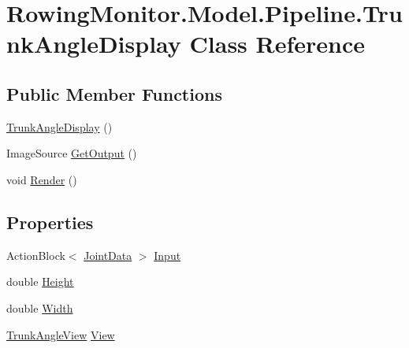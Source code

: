 \hypertarget{class_rowing_monitor_1_1_model_1_1_pipeline_1_1_trunk_angle_display}{}\section{Rowing\+Monitor.\+Model.\+Pipeline.\+Trunk\+Angle\+Display Class Reference}
\label{class_rowing_monitor_1_1_model_1_1_pipeline_1_1_trunk_angle_display}
\subsection*{Public Member Functions}
\begin{DoxyCompactItemize}
\item 
\hyperlink{class_rowing_monitor_1_1_model_1_1_pipeline_1_1_trunk_angle_display_aa821fa5b4473ec7cc3ce2947fb9b4b73}{Trunk\+Angle\+Display} ()
\item 
Image\+Source \hyperlink{class_rowing_monitor_1_1_model_1_1_pipeline_1_1_trunk_angle_display_ac1e4cc748894dc3d2bb8bbd0ec17226e}{Get\+Output} ()
\item 
void \hyperlink{class_rowing_monitor_1_1_model_1_1_pipeline_1_1_trunk_angle_display_a3f82a22f8d195e8285ec1008514b8a3a}{Render} ()
\end{DoxyCompactItemize}
\subsection*{Properties}
\begin{DoxyCompactItemize}
\item 
Action\+Block$<$ \hyperlink{struct_rowing_monitor_1_1_model_1_1_util_1_1_joint_data}{Joint\+Data} $>$ \hyperlink{class_rowing_monitor_1_1_model_1_1_pipeline_1_1_trunk_angle_display_a2bbac9839cfa5977f133be79c3c47754}{Input}
\item 
double \hyperlink{class_rowing_monitor_1_1_model_1_1_pipeline_1_1_trunk_angle_display_ad8ae0fc35ad101ac1c7e5fa75eace01e}{Height}
\item 
double \hyperlink{class_rowing_monitor_1_1_model_1_1_pipeline_1_1_trunk_angle_display_a44e27b142945a82a101bb38cbd5a3c1f}{Width}
\item 
\hyperlink{class_rowing_monitor_1_1_view_1_1_trunk_angle_view}{Trunk\+Angle\+View} \hyperlink{class_rowing_monitor_1_1_model_1_1_pipeline_1_1_trunk_angle_display_ac0578beabcf4ec767137c3e7b9d50493}{View}
\end{DoxyCompactItemize}


